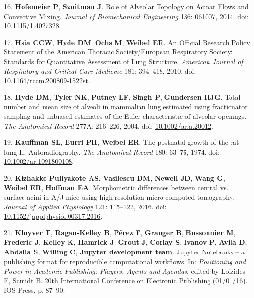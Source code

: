 \documentclass[
  american,
]{article}
\newenvironment{cslreferences}%
  {}%
  {\par}
\begin{document}
\begin{cslreferences}
\leavevmode\hypertarget{ref-1DP2FRUSZ}{}%
16. \textbf{Hofemeier P}, \textbf{Sznitman J}. Role of Alveolar Topology on Acinar Flows and Convective Mixing. \emph{Journal of Biomechanical Engineering} 136: 061007, 2014. doi: \href{https://doi.org/10.1115/1.4027328}{10.1115/1.4027328}.

\leavevmode\hypertarget{ref-dNc8FfNn}{}%
17. \textbf{Hsia CCW}, \textbf{Hyde DM}, \textbf{Ochs M}, \textbf{Weibel ER}. An Official Research Policy Statement of the American Thoracic Society/European Respiratory Society: Standards for Quantitative Assessment of Lung Structure. \emph{American Journal of Respiratory and Critical Care Medicine} 181: 394--418, 2010. doi: \href{https://doi.org/10.1164/rccm.200809-1522st}{10.1164/rccm.200809-1522st}.

\leavevmode\hypertarget{ref-QiAxY2i3}{}%
18. \textbf{Hyde DM}, \textbf{Tyler NK}, \textbf{Putney LF}, \textbf{Singh P}, \textbf{Gundersen HJG}. Total number and mean size of alveoli in mammalian lung estimated using fractionator sampling and unbiased estimates of the Euler characteristic of alveolar openings. \emph{The Anatomical Record} 277A: 216--226, 2004. doi: \href{https://doi.org/10.1002/ar.a.20012}{10.1002/ar.a.20012}.

\leavevmode\hypertarget{ref-1AhvLCPky}{}%
19. \textbf{Kauffman SL}, \textbf{Burri PH}, \textbf{Weibel ER}. The postnatal growth of the rat lung II. Autoradiography. \emph{The Anatomical Record} 180: 63--76, 1974. doi: \href{https://doi.org/10.1002/ar.1091800108}{10.1002/ar.1091800108}.

\leavevmode\hypertarget{ref-RGBeCf8v}{}%
20. \textbf{Kizhakke Puliyakote AS}, \textbf{Vasilescu DM}, \textbf{Newell JD}, \textbf{Wang G}, \textbf{Weibel ER}, \textbf{Hoffman EA}. Morphometric differences between central vs. surface acini in A/J mice using high-resolution micro-computed tomography. \emph{Journal of Applied Physiology} 121: 115--122, 2016. doi: \href{https://doi.org/10.1152/japplphysiol.00317.2016}{10.1152/japplphysiol.00317.2016}.

\leavevmode\hypertarget{ref-pQ6Wbz73}{}%
21. \textbf{Kluyver T}, \textbf{Ragan-Kelley B}, \textbf{Pérez F}, \textbf{Granger B}, \textbf{Bussonnier M}, \textbf{Frederic J}, \textbf{Kelley K}, \textbf{Hamrick J}, \textbf{Grout J}, \textbf{Corlay S}, \textbf{Ivanov P}, \textbf{Avila D}, \textbf{Abdalla S}, \textbf{Willing C}, \textbf{Jupyter development team}. Jupyter Notebooks -- a publishing format for reproducible computational workflows. In: \emph{Positioning and Power in Academic Publishing: Players, Agents and Agendas}, edited by Loizides F, Scmidt B. 20th International Conference on Electronic Publishing (01/01/16). IOS Press, p. 87--90.


\end{cslreferences}
\end{document}
